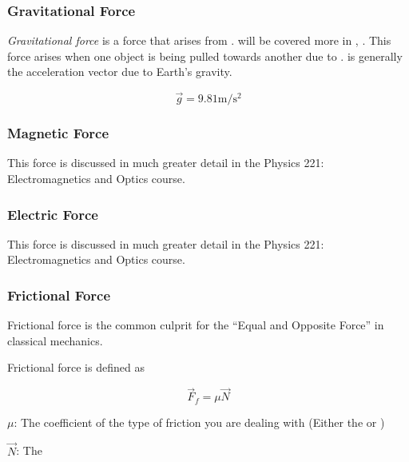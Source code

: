 \subsubsection{Gravitational Force}\label{subsubsec:Gravitational Force}
\begin{definition}\label{def:Gravitational Force}
  \emph{Gravitational force} is a force that arises from .
   will be covered more in , .
  This force arises when one object is being pulled towards another due to .
   is generally the acceleration vector due to Earth's gravity.

  \begin{equation}\label{eq:Gravitational Force}
    \vec{g} = 9.81 \si{\meter / \second^{2}}
  \end{equation}
\end{definition}

\subsubsection{Magnetic Force}\label{subsubsec:Magnetic Force}
This force is discussed in much greater detail in the Physics 221: Electromagnetics and Optics course.

\subsubsection{Electric Force}\label{subsubsec:Electric Force}
This force is discussed in much greater detail in the Physics 221: Electromagnetics and Optics course.

\subsubsection{Frictional Force}\label{subsubsec:Frictional Force}
Frictional force is the common culprit for the ``Equal and Opposite Force'' in classical mechanics.

\begin{definition}\label{def:Frictional Force}
  Frictional force is defined as

  \begin{equation}\label{eq:Frictional Force}
    \vec{F}_{f} = \mu \vec{N}
  \end{equation}
  \begin{description}[noitemsep]
    \item $\mu$: The coefficient of the type of friction you are dealing with (Either the  or )
    \item $\vec{N}$: The 
  \end{description}
\end{definition}

